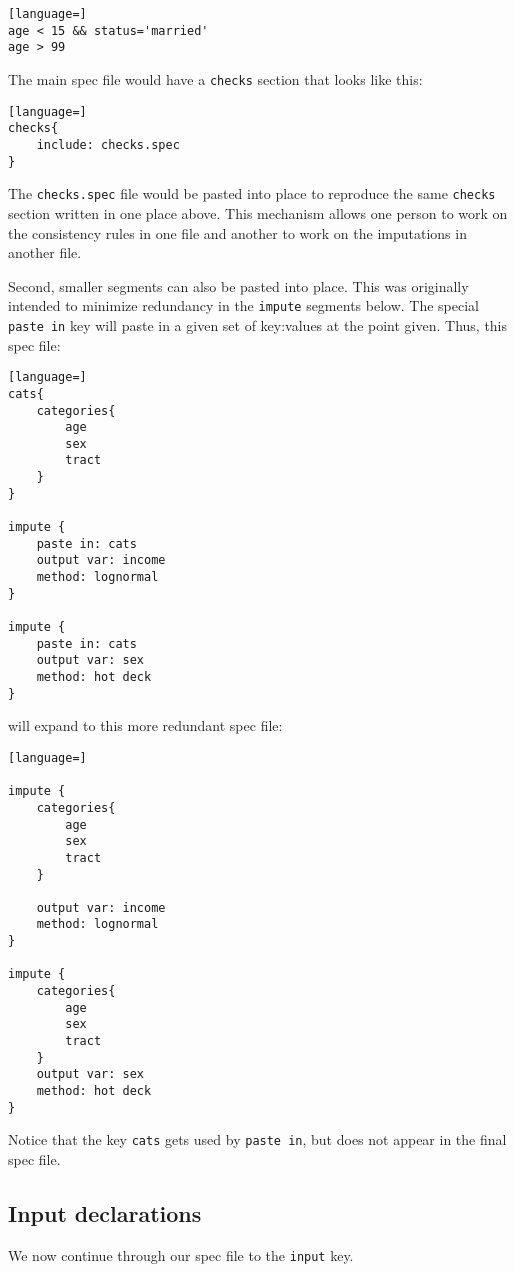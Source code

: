 \documentclass{article}
\begin{document}
\begin{lstlisting}[language=]
age < 15 && status='married'
age > 99
\end{lstlisting}

The main spec file would have a {\tt checks} section that looks like this:

\begin{lstlisting}[language=]
checks{
    include: checks.spec
}
\end{lstlisting}

The {\tt checks.spec} file would be pasted into place to reproduce the same {\tt checks}
section written in one place above. This mechanism allows one person to work on the
consistency rules in one file and another to work on the imputations in another file.

Second, smaller segments can also be pasted into place. This was originally intended to
minimize redundancy in the {\tt impute} segments below. The special {\tt paste in} key
will paste in a given set of key:values at the point given. Thus, this spec file:

\begin{lstlisting}[language=]
cats{
    categories{
        age
        sex
        tract
    }
}

impute {
    paste in: cats
    output var: income
    method: lognormal
}

impute {
    paste in: cats
    output var: sex
    method: hot deck
}
\end{lstlisting}

will expand to this more redundant spec file:

\begin{lstlisting}[language=]

impute {
    categories{
        age
        sex
        tract
    }

    output var: income
    method: lognormal
}

impute {
    categories{
        age
        sex
        tract
    }
    output var: sex
    method: hot deck
}
\end{lstlisting}

Notice that the key {\tt cats} gets used by {\tt paste in}, but does not appear in
the final spec file.


\subsection{Input declarations}
We now continue through our spec file to the {\tt input} key.
\end{document}
